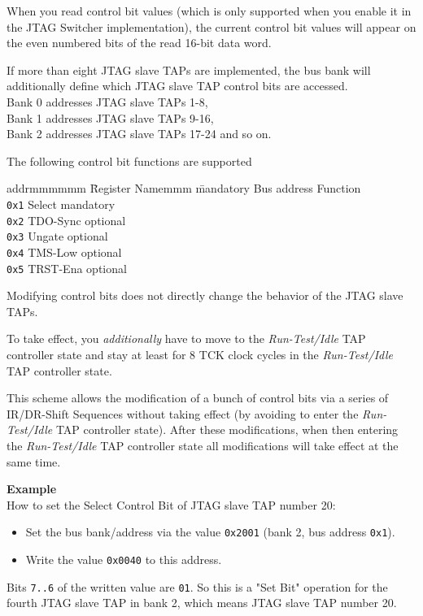\documentclass[10pt,english,a4paper]{report}
\begin{document}
When you read control bit values (which is only supported when you enable it
in the JTAG Switcher implementation), the current control bit values will
appear on the even numbered bits of the read 16-bit data word.

If more than eight JTAG slave TAPs are implemented, the bus bank will additionally
define which JTAG slave TAP control bits are accessed.\\
Bank 0 addresses JTAG slave TAPs 1-8, \\
Bank 1 addresses JTAG slave TAPs 9-16, \\
Bank 2 addresses JTAG slave TAPs 17-24 and so on.

The following control bit functions are supported
\begin{tabbing}
addrmmmmmm \= Register Namemmm \= mandatory \kill
Bus address \> Function \\
{\tt 0x1} \> Select    \> mandatory \\
{\tt 0x2} \> TDO-Sync  \> optional  \\
{\tt 0x3} \> Ungate    \> optional  \\
{\tt 0x4} \> TMS-Low   \> optional  \\
{\tt 0x5} \> TRST-Ena  \> optional  \\
\end{tabbing}

Modifying control bits does not directly change the behavior of the JTAG slave TAPs.

To take effect, you {\em additionally} have to move to the
{\em Run-Test/Idle} TAP controller state and stay at least for 8 TCK clock cycles
in the {\em Run-Test/Idle} TAP controller state.

This scheme allows the modification of a bunch of control bits via a series of IR/DR-Shift
Sequences without taking effect (by avoiding to enter the {\em Run-Test/Idle} TAP controller state).
After these modifications, when then entering the {\em Run-Test/Idle} TAP controller state
all modifications will take effect at the same time.

{\bf Example}\\
How to set the Select Control Bit of JTAG slave TAP number 20:
\begin{itemize}
\item Set the bus bank/address via the value {\tt 0x2001} (bank 2, bus address {\tt 0x1}).
\item Write the value {\tt 0x0040} to this address.
\end{itemize}
Bits {\tt 7..6} of the written value are {\tt 01}. So this is a "Set Bit" operation
for the fourth JTAG slave TAP in bank 2, which means JTAG slave TAP number 20.
\end{document}
